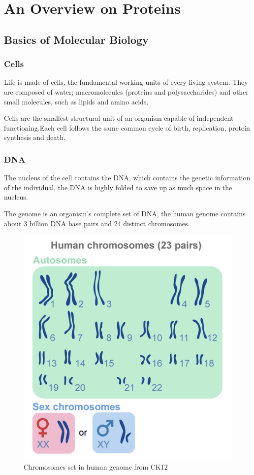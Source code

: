 \chapter{An Overview on Proteins}
\label{chp:proteins}

\section{Basics of Molecular Biology}
\subsection{Cells}
Life is made of cells, the fundamental working units of every living system. They are composed of water; macromolecules (proteins and polysaccharides) and other small molecules, such as lipids and amino acids. 

Cells are the smallest structural unit of an organism capable of independent functioning.Each cell follows the same common cycle of birth, replication, protein synthesis and death. 

\subsection{DNA}
The nucleus of the cell contains the DNA, which contains the genetic information of the individual, the DNA is highly folded to save up as much space in the nucleus.

The genome is an organism's complete set of DNA, the human genome contains about 3 billion DNA base pairs and 24 distinct chromosomes.  

\begin{figure}[h]
	\includegraphics[scale=0.8]{res/proteins_overview/chromosomes.png}
	\caption{Chromosomes set in human genome from CK12 \cite{chromosomes}}
	\label{fig:chromosomes}
\end{figure}

